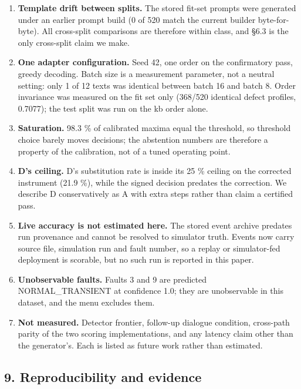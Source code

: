 \documentclass[
  10pt,
]{article}
\providecommand{\tightlist}{%
  \setlength{\itemsep}{0pt}\setlength{\parskip}{0pt}}
\begin{document}
\begin{enumerate}
\def\labelenumi{\arabic{enumi}.}
\tightlist
\item
  \textbf{Template drift between splits.} The stored fit-set prompts
  were generated under an earlier prompt build (0 of 520 match the
  current builder byte-for-byte). All cross-split comparisons are
  therefore within class, and \S6.3 is the only cross-split claim we
  make.
\item
  \textbf{One adapter configuration.} Seed 42, one order on the
  confirmatory pass, greedy decoding. Batch size is a measurement
  parameter, not a neutral setting: only 1 of 12 texts was identical
  between batch 16 and batch 8. Order invariance was measured on the fit
  set only (368/520 identical defect profiles, 0.7077); the test split
  was run on the kb order alone.
\item
  \textbf{Saturation.} 98.3 \% of calibrated maxima equal the threshold,
  so threshold choice barely moves decisions; the abstention numbers are
  therefore a property of the calibration, not of a tuned operating
  point.
\item
  \textbf{D's ceiling.} D's substitution rate is inside its 25 \%
  ceiling on the corrected instrument (21.9 \%), while the signed
  decision predates the correction. We describe D conservatively as A
  with extra steps rather than claim a certified pass.
\item
  \textbf{Live accuracy is not estimated here.} The stored event archive
  predates run provenance and cannot be resolved to simulator truth.
  Events now carry source file, simulation run and fault number, so a
  replay or simulator-fed deployment is scorable, but no such run is
  reported in this paper.
\item
  \textbf{Unobservable faults.} Faults 3 and 9 are predicted
  NORMAL\_TRANSIENT at confidence 1.0; they are unobservable in this
  dataset, and the menu excludes them.
\item
  \textbf{Not measured.} Detector frontier, follow-up dialogue
  condition, cross-path parity of the two scoring implementations, and
  any latency claim other than the generator's. Each is listed as future
  work rather than estimated.
\end{enumerate}

\subsection{9. Reproducibility and
evidence}\label{reproducibility-and-evidence}
\end{document}

